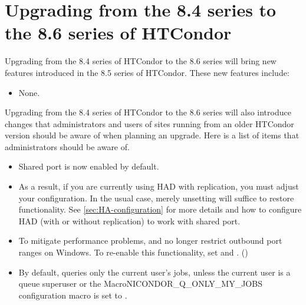 \section{\label{sec:to-8.6}Upgrading from the 8.4 series to the 8.6 series of HTCondor}

Upgrading from the 8.4 series of HTCondor to the 8.6 series
will bring new features introduced in the 8.5 series of HTCondor.
These new features include:
\begin{itemize}

\item None.

\end{itemize}

Upgrading from the 8.4 series of HTCondor to the 8.6 series will
also introduce changes that administrators and users of sites running from an older
HTCondor version should be aware of when planning an upgrade.
Here is a list of items that administrators should be aware of.

\begin{itemize}

\item Shared port is now enabled by default.

\item As a result, if you are currently using HAD with replication, you must
adjust your configuration.  In the usual case, merely unsetting
 will suffice to restore functionality.
See \ref{sec:HA-configuration} for more details and how to configure HAD
(with or without replication) to work with shared port.

\item To mitigate performance problems,  and
 no longer restrict outbound port ranges on Windows.  To
re-enable this functionality, set  and
.  ()

\item By default,  queries only the current user's jobs,
unless the current user is a queue superuser or the
MacroNI{CONDOR\_Q\_ONLY\_MY\_JOBS} configuration macro is set to
.


\end{itemize}

